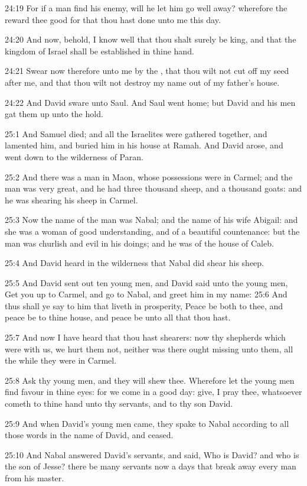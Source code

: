 24:19 For if a man find his enemy, will he let him go well away?  wherefore the \LORD reward thee good for that thou hast done unto me this day.

24:20 And now, behold, I know well that thou shalt surely be king, and that the kingdom of Israel shall be established in thine hand.

24:21 Swear now therefore unto me by the \LORD, that thou wilt not cut off my seed after me, and that thou wilt not destroy my name out of my father's house.

24:22 And David sware unto Saul. And Saul went home; but David and his men gat them up unto the hold.

25:1 And Samuel died; and all the Israelites were gathered together, and lamented him, and buried him in his house at Ramah. And David arose, and went down to the wilderness of Paran.

25:2 And there was a man in Maon, whose possessions were in Carmel; and the man was very great, and he had three thousand sheep, and a thousand goats: and he was shearing his sheep in Carmel.

25:3 Now the name of the man was Nabal; and the name of his wife Abigail: and she was a woman of good understanding, and of a beautiful countenance: but the man was churlish and evil in his doings; and he was of the house of Caleb.

25:4 And David heard in the wilderness that Nabal did shear his sheep.

25:5 And David sent out ten young men, and David said unto the young men, Get you up to Carmel, and go to Nabal, and greet him in my name: 25:6 And thus shall ye say to him that liveth in prosperity, Peace be both to thee, and peace be to thine house, and peace be unto all that thou hast.

25:7 And now I have heard that thou hast shearers: now thy shepherds which were with us, we hurt them not, neither was there ought missing unto them, all the while they were in Carmel.

25:8 Ask thy young men, and they will shew thee. Wherefore let the young men find favour in thine eyes: for we come in a good day: give, I pray thee, whatsoever cometh to thine hand unto thy servants, and to thy son David.

25:9 And when David's young men came, they spake to Nabal according to all those words in the name of David, and ceased.

25:10 And Nabal answered David's servants, and said, Who is David? and who is the son of Jesse? there be many servants now a days that break away every man from his master.

